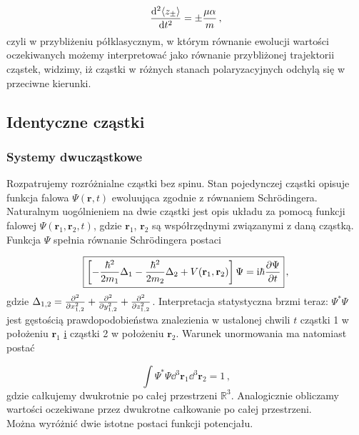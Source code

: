 \documentclass{myclass}
\begin{document}
\begin{equation*}
\dv[2]{\langle z_\pm\rangle}{t}=\pm\frac{\mu\alpha}{m}\,,
\end{equation*}
czyli w przybliżeniu półklasycznym, w którym równanie ewolucji wartości oczekiwanych możemy
interpretować jako równanie przybliżonej trajektorii cząstek, widzimy, iż cząstki w różnych stanach
polaryzacyjnych odchylą się w przeciwne kierunki.

\subsection{Identyczne cząstki}

\subsubsection{Systemy dwucząstkowe}

Rozpatrujemy rozróżnialne cząstki bez spinu. Stan pojedynczej cząstki opisuje funkcja falowa
\(\Psi(\mathbf{r},t)\) ewoluująca zgodnie z równaniem Schr{\"o}dingera. Naturalnym uogólnieniem na
dwie cząstki jest opis układu za pomocą funkcji falowej \(\Psi(\mathbf{r}_1,\mathbf{r}_2,t)\), gdzie
\(\mathbf{r}_1\), \(\mathbf{r}_2\) są współrzędnymi związanymi z daną cząstką. Funkcja \(\Psi\)
spełnia równanie Schr{\"o}dingera postaci

\begin{equation*}
\boxed{\left[-\frac{\hbar^2}{2m_1}\Delta_1-\frac{\hbar^2}{2m_2}\Delta_2+V(\mathbf{r}_1,\mathbf{r}_2)\right]\Psi=\mathrm{i}\hbar\pdv{\Psi}{t}}\,,
\end{equation*}
gdzie \(\Delta_{1,2}=\pdv[2]{ }{x_{1,2}}+\pdv[2]{ }{y_{1,2}}+\pdv[2]{ }{z_{1,2}}\). Interpretacja
statystyczna brzmi teraz: \(\Psi^*\Psi\) jest gęstością prawdopodobieństwa znalezienia w ustalonej
chwili \(t\) cząstki 1 w położeniu \(\mathbf{r}_1\) \underline{i} cząstki 2 w położeniu
\(\mathbf{r}_2\). Warunek unormowania ma natomiast postać

\begin{equation*}
\int\Psi^*\Psi\dd{^3\mathbf{r}_1}\dd{^3\mathbf{r}_2}=1\,,
\end{equation*}
gdzie całkujemy dwukrotnie po całej przestrzeni \(\mathbb{R}^3\). Analogicznie obliczamy wartości
oczekiwane przez dwukrotne całkowanie po całej przestrzeni.\\

Można wyróżnić dwie istotne postaci funkcji potencjału.
\end{document}
